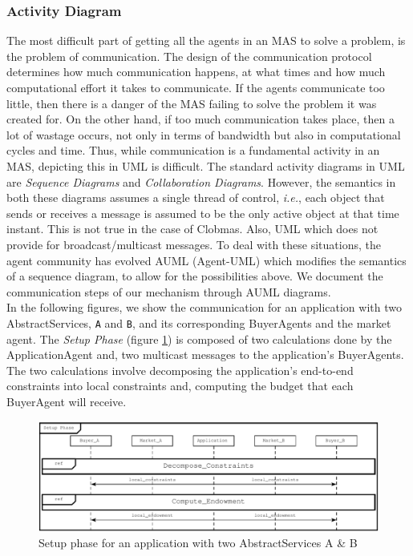 \documentclass[10pt,journal,compsoc]{IEEEtran}
\begin{document}
\subsubsection{Activity Diagram} The most difficult part of getting all the agents in an MAS to solve a problem, is the problem of communication. The design of the communication protocol determines how much communication happens, at what times and how much computational effort it takes to communicate. If the agents communicate too little, then there is a danger of the MAS failing to solve the problem it was created for. On the other hand, if too much communication takes place, then a lot of wastage occurs, not only in terms of bandwidth but also in computational cycles and time. Thus, while communication is a fundamental activity in an MAS, depicting this in UML is difficult. The standard activity diagrams in UML are \textit{Sequence Diagrams} and \textit{Collaboration Diagrams}. However, the semantics in both these diagrams assumes a single thread of control, \textit{i.e.}, each object that sends or receives a message is assumed to be the only active object at that time instant. This is not true in the case of Clobmas.  Also, UML which does not provide for broadcast/multicast messages. To deal with these situations, the agent community has evolved AUML (Agent-UML) which modifies the semantics of a sequence diagram, to allow for the possibilities above. We document the communication steps of our mechanism through AUML diagrams.\\
In the following figures, we show the communication for an application with two AbstractServices, \texttt{A} and \texttt{B}, and its corresponding BuyerAgents and the market agent. The \emph{Setup Phase} (figure \ref{fig:setup_phase}) is composed of two calculations done by the ApplicationAgent and, two multicast messages to the application's BuyerAgents. The two calculations involve decomposing the application's end-to-end constraints into local constraints and, computing the budget that each BuyerAgent will receive.
\begin{figure}[h]
\centering
\includegraphics[scale=0.3]{drawings/setup_phase.pdf}
\caption{Setup phase for an application with two AbstractServices A \& B \label{fig:setup_phase}}
\end{figure}
\end{document}
